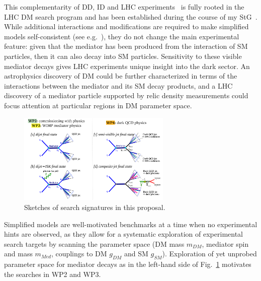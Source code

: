 This complementarity of DD, ID and LHC experiments~\cite{Bauer:2013ihz} is fully rooted in the LHC DM search program and has been established during the course of my StG~\cite{Boveia:2016mrp}.
\indent
While additional interactions and modifications are required to make simplified models self-consistent (see e.g.~\cite{Ellis:2018xal}), they do not change the main experimental feature: given that the mediator has been produced from the interaction of SM particles, then it can also decay into SM particles. 
Sensitivity to these visible mediator decays gives LHC experiments unique insight into the dark sector. 
An astrophysics discovery of DM could be further characterized in terms of the interactions between the mediator and its SM decay products, 
and a LHC discovery of a mediator particle supported by relic density measurements could focus attention at particular regions in DM parameter space. 

\begin{figure} 
\begin{center}
\includegraphics[width=0.65\textwidth]{figs_B2/feynman.pdf}
\caption{Sketches of search signatures in this proposal.\color{black}\label{fig:feynman} }
\end{center}
\vskip-10pt
\end{figure}

Simplified models are well-motivated benchmarks at a time when no experimental hints are observed, as they allow for a systematic exploration of experimental search targets by scanning the parameter space (DM mass $m_{DM}$, mediator spin and mass $m_{Med}$, couplings to DM $g_{DM}$ and SM $g_{SM}$).
Exploration of yet unprobed parameter space for mediator decays as in the left-hand side of Fig.~\ref{fig:feynman} motivates the searches in WP2 and WP3. 


